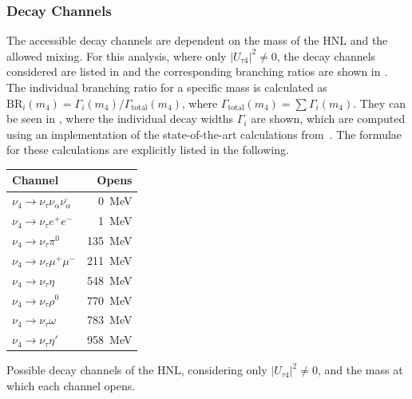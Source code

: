 \subsubsection{Decay Channels}

The accessible decay channels are dependent on the mass of the HNL and the allowed mixing. For this analysis, where only $|U_{\tau4}|^2 \neq 0$, the decay channels considered are listed in  and the corresponding branching ratios are shown in . The individual branching ratio for a specific mass is calculated as $\mathrm{BR}_i(m_4)=\Gamma_i(m_4)/\Gamma_\mathrm{total}(m_4)$, where $\Gamma_\mathrm{total}(m_4)=\sum\Gamma_i(m_4)$. They can be seen in , where the individual decay widths $\Gamma_i$ are shown, which are computed using an implementation of the state-of-the-art calculations from~\cite{Coloma:2020lgy}. The formulae for these calculations are explicitly listed in the following.

\begin{margintable}[-1cm]
    \begin{tabular} { lr }
        \hline\hline 
        \textbf{Channel} & \textbf{Opens}  \\
        \hline\hline 
        $\nu_4 \rightarrow \nu_\tau \nu_\alpha \bar{\nu_\alpha}$ & \SI{0}{\MeV} \\
        $\nu_4 \rightarrow \nu_\tau e^+ e^-$ & \SI{1}{\MeV} \\
        $\nu_4 \rightarrow \nu_\tau \pi^0$ & \SI{135}{\MeV} \\
        $\nu_4 \rightarrow \nu_\tau \mu^+ \mu^-$ & \SI{211}{\MeV} \\
        $\nu_4 \rightarrow \nu_\tau \eta$ & \SI{548}{\MeV} \\
        $\nu_4 \rightarrow \nu_\tau \rho^0$ & \SI{770}{\MeV} \\
        $\nu_4 \rightarrow \nu_\tau \omega$ & \SI{783}{\MeV} \\
        $\nu_4 \rightarrow \nu_\tau \eta'$ & \SI{958}{\MeV} \\
        \hline
    \end{tabular}
    \caption[HNL mass dependent decay channels]{Possible decay channels of the HNL, considering only $|U_{\tau4}|^2 \neq 0$, and the mass at which each channel opens.}
\end{margintable}

